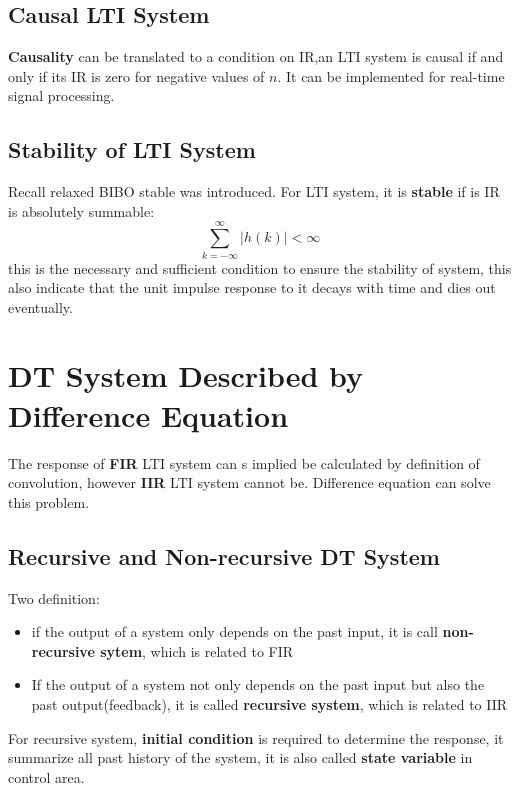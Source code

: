 \documentclass[10pt,a4paper,oneside]{article}
\begin{document}
\subsection{Causal LTI System}
\textbf{Causality} can be translated to a condition on IR,an LTI system is causal if and only if its IR is zero for negative values of $n$. It can be implemented for real-time signal processing.

\subsection{Stability of LTI System}
Recall relaxed BIBO stable was introduced. For LTI system, it is \textbf{stable} if is IR is absolutely summable:
\[
\sum_{k=-\infty}^{\infty} |h(k)| < \infty
\]
this is the necessary and sufficient condition to ensure the stability of system, this also indicate that the unit impulse response to it decays with time and dies out eventually.

\section{DT System Described by Difference Equation}
The response of \textbf{FIR} LTI system can s implied be calculated by definition of convolution, however \textbf{IIR} LTI system cannot be. Difference equation can solve this problem.

\subsection{Recursive and Non-recursive DT System}
Two definition:
\begin{itemize}
	\item if the output of a system only depends on the past input, it is call \textbf{non-recursive sytem}, which is related to FIR
	\item If the output of a system not only depends on the past input but also the past output(feedback), it is called \textbf{recursive system}, which is related to IIR
\end{itemize}
For recursive system, \textbf{initial condition} is required to determine the response, it summarize all past history of the system, it is also called \textbf{state variable} in control area.
\end{document}
